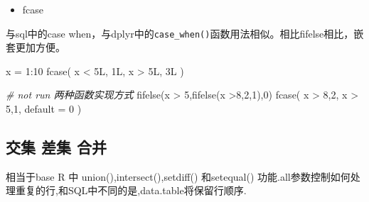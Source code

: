 \documentclass[
]{book}
\newenvironment{Shaded}{\begin{snugshade}}{\end{snugshade}}
\newcommand{\AttributeTok}[1]{\textcolor[rgb]{0.77,0.63,0.00}{#1}}
\newcommand{\CommentTok}[1]{\textcolor[rgb]{0.56,0.35,0.01}{\textit{#1}}}
\newcommand{\DecValTok}[1]{\textcolor[rgb]{0.00,0.00,0.81}{#1}}
\newcommand{\FunctionTok}[1]{\textcolor[rgb]{0.00,0.00,0.00}{#1}}
\newcommand{\NormalTok}[1]{#1}
\newcommand{\OtherTok}[1]{\textcolor[rgb]{0.56,0.35,0.01}{#1}}
\newcommand{\SpecialCharTok}[1]{\textcolor[rgb]{0.00,0.00,0.00}{#1}}
\providecommand{\tightlist}{%
  \setlength{\itemsep}{0pt}\setlength{\parskip}{0pt}}
\begin{document}
\begin{itemize}
\tightlist
\item
  fcase
\end{itemize}

与sql中的case when，与dplyr中的\texttt{case\_when()}函数用法相似。相比fifelse相比，嵌套更加方便。

\begin{Shaded}
\begin{Highlighting}[]
\NormalTok{x }\OtherTok{=} \DecValTok{1}\SpecialCharTok{:}\DecValTok{10}
\FunctionTok{fcase}\NormalTok{(}
\NormalTok{    x }\SpecialCharTok{\textless{}}\NormalTok{ 5L, 1L,}
\NormalTok{    x }\SpecialCharTok{\textgreater{}}\NormalTok{ 5L, 3L}
\NormalTok{)}

\CommentTok{\# not run 两种函数实现方式}
\FunctionTok{fifelse}\NormalTok{(x }\SpecialCharTok{\textgreater{}} \DecValTok{5}\NormalTok{,}\FunctionTok{fifelse}\NormalTok{(x }\SpecialCharTok{\textgreater{}}\DecValTok{8}\NormalTok{,}\DecValTok{2}\NormalTok{,}\DecValTok{1}\NormalTok{),}\DecValTok{0}\NormalTok{)}
\FunctionTok{fcase}\NormalTok{(}
\NormalTok{  x }\SpecialCharTok{\textgreater{}} \DecValTok{8}\NormalTok{,}\DecValTok{2}\NormalTok{,}
\NormalTok{  x }\SpecialCharTok{\textgreater{}} \DecValTok{5}\NormalTok{,}\DecValTok{1}\NormalTok{,}
  \AttributeTok{default =} \DecValTok{0}
\NormalTok{)}
\end{Highlighting}
\end{Shaded}

\hypertarget{ux4ea4ux96c6-ux5deeux96c6-ux5408ux5e76}{%
\subsection{交集 差集 合并}\label{ux4ea4ux96c6-ux5deeux96c6-ux5408ux5e76}}

相当于base R 中 union(),intersect(),setdiff() 和setequal() 功能.all参数控制如何处理重复的行,和SQL中不同的是,data.table将保留行顺序.
\end{document}
